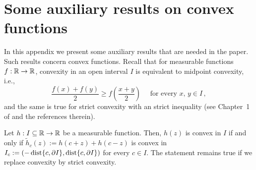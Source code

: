 \section{Some auxiliary results on convex functions}
\label{Sec:AuxiliaryResults}

In this appendix we present some auxiliary results that are needed in the paper. Such results concern convex functions. Recall that for measurable functions $f:\mathbb{R}\to \mathbb{R}$, convexity in an open interval $I$ is equivalent to midpoint convexity, i.e.,
$$
\dfrac{f(x) + f(y)}{2} \geq f \left( \dfrac{x+y}{2}\right) \quad \textrm{ for every } x,\, y \in I\,,
$$
and the same is true for strict convexity with an strict inequality
(see Chapter~1 of \cite{Niculescu} and the references therein).



\begin{lemma}
\label{Lemma:Convex<->AllReflectionsConvex}
Let $h: I \subseteq \mathbb{R} \to \mathbb{R}$ be a measurable function. Then, $h(z)$ is convex in $I$ if and only if $\widetilde{h}_c(z) := h(c+z) + h(c-z)$ is convex in $I_c := (-\operatorname{dist}\{c, \partial I\}, \operatorname{dist}\{c, \partial I\})$ for every $c\in I$.
The statement remains true if we replace convexity by strict convexity.
\end{lemma}

